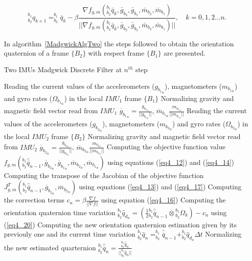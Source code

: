 \begin{equation}
\label{eq4_22}
^{b_1}_{b_2} q_{k+1} = ^{b_1}_{b_2} \bar{q}_k - \beta \frac{\nabla f_{g,m}(^{b_1}_{b_2} \bar{q}_k,\bar{g}_{b_2},\bar{g}_{b_1},\bar{m}_{b_2},\bar{m}_{b_1}) }{\vert \vert \nabla f_{g,m}(^{b_1}_{b_2} \bar{q}_k,\bar{g}_{b_2},\bar{g}_{b_1},\bar{m}_{b_2},\bar{m}_{b_1})  \vert \vert}, \quad k = 0,1,2 \dots n.
\end{equation}

In algorithm~\ref{MadgwickAlgTwo} the steps followed to obtain the orientation quaternion of a frame $\{ B_2 \}$ with respect frame $\{ B_1 \}$ are presented.

\begin{algorithm}
\caption{Two IMUs Madgwick Discrete Filter at $n^{th}$ step}
\begin{algorithmic}[1]
\label{MadgwickAlgTwo}
\STATE Reading the current values of the accelerometers ($g_{{b_1}_n}$), magnetometers ($m_{{b_1}_n}$) and gyro rates ($\Omega_{{b_1}_n}$) in the local $IMU_1$ frame $\{B_1\}$
\STATE Normalizing gravity and magnetic field vector read from $IMU_1$ $\overline{g}_{{b_1}_n} = \frac{g_{{b_1}_n}}{\vert \vert g_{{b_1}_n} \vert \vert}$, $\overline{m}_{{b_1}_n} \frac{m_{{b_1}_n}}{\vert \vert m_{{b_1}_n} \vert \vert}$
\STATE Reading the current values of the accelerometers ($g_{{b_2}_n}$), magnetometers ($m_{{b_2}_n}$) and gyro rates ($\Omega_{{b_2}_n}$) in the local $IMU_2$ frame $\{B_2\}$
\STATE Normalizing gravity and magnetic field vector read from $IMU_2$ $\overline{g}_{{b_2}_n} = \frac{g_{{b_2}_n}}{\vert \vert g_{{b_2}_n} \vert \vert}$, $\overline{m}_{{b_2}_n} \frac{m_{{b_2}_n}}{\vert \vert m_{{b_2}_n} \vert \vert}$
\STATE Computing the objective function value $f_{g,m}({^{b_1}_{b_2}\hat{\overline{q}}_{n-1}},\overline{g}_{{b_2}_n},\overline{g}_{{b_1}_n},\overline{m}_{{b_2}_n},\overline{m}_{{b_1}_n})$ using equations (\ref{eq4_12}) and (\ref{eq4_14})
\STATE Computing the transpose of the Jacobian of the objective function $J^T_{g,m}(^{b_1}_{b_2}\hat{\overline{q}}_{n-1},\overline{g}_{{b_2}_n},\overline{m}_{{b_2}_n})$ using equations (\ref{eq4_13}) and (\ref{eq4_17})
\STATE Computing the correction terms $c_n =  \beta \frac{\nabla f}{\vert \vert \nabla f \vert \vert}$ using equation (\ref{eq4_16})
\STATE Computing the orientation quaternion time variation $^{b_1}_{b_2} \hat{q}_{d_n} =  (\frac{1}{2} {^{b_1}_{b_2}\hat{\overline{q}}_{n-1}} \otimes {^{b_1}_{b_2} \Omega_k}) - c_n$ using (\ref{eq4_20})
\STATE Computing the new orientation quaternion estimation given by its previouly one and its current time variation $^{b_1}_{b_2} \hat{q}_n = ^{b_1}_{b_2}\hat{\overline{q}}_{n-1} + ^{b_1}_{b_2} \hat{q}_{d_n} \Delta t$
\STATE Normalizing the new estimated quarternion $^{b_1}_{b_2} \hat{\overline{q}}_n = \frac{^{b_1}_{b_2} \hat{q}_n}{\vert \vert ^{b_1}_{b_2} \hat{q}_n \vert \vert}$
\end{algorithmic}
\end{algorithm}

